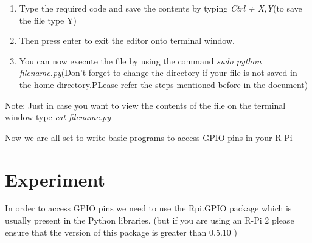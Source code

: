 \documentclass[11pt,a4paper]{article}
\begin{document}
\begin{enumerate}
\begin{itemize}
\begin{enumerate}
\begin{figure}[h!]
					\centering
				\end{figure}
				\item Type the required code and save the contents by typing \textit{Ctrl + X,Y}(to save the file type Y)
				\item Then press enter to exit the editor onto terminal window.
				\item You can now execute the file by using the command \textit{sudo python filename.py}(Don't forget to change the directory if your file is not saved in the home directory.PLease refer the steps mentioned before in the document)
			\end{enumerate}
			Note: Just in case you want to view the contents of the file on the terminal window type \textit{cat filename.py}
		\end{itemize}				
	\end{enumerate}
	\vspace{0.3cm}
	Now we are all set to write basic programs to access GPIO pins in your R-Pi
	
	\newpage
	\section{Experiment}
	 In order to access GPIO pins we need to use the Rpi.GPIO package which is usually present in the Python libraries. (but if you are using an R-Pi 2 please ensure that the version of this package is greater than 0.5.10 )
	 
\end{document}
